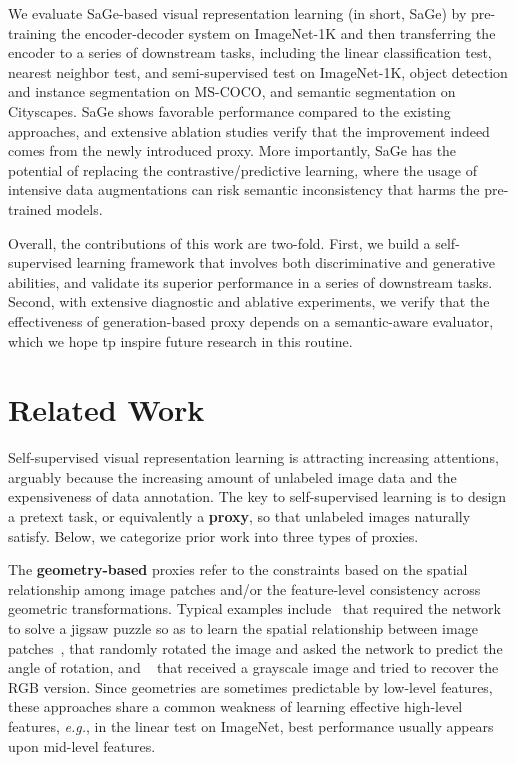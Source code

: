 \documentclass[10pt,twocolumn,letterpaper]{article}
\begin{document}
We evaluate SaGe-based visual representation learning (in short, SaGe) by pre-training the encoder-decoder system on ImageNet-1K and then transferring the encoder to a series of downstream tasks, including the linear classification test, nearest neighbor test, and semi-supervised test on ImageNet-1K, object detection and instance segmentation on MS-COCO, and semantic segmentation on Cityscapes. SaGe shows favorable performance compared to the existing approaches, and extensive ablation studies verify that the improvement indeed comes from the newly introduced proxy. More importantly, SaGe has the potential of replacing the contrastive/predictive learning, where the usage of intensive data augmentations can risk semantic inconsistency that harms the pre-trained models.

Overall, the contributions of this work are two-fold. First, we build a self-supervised learning framework that involves both discriminative and generative abilities, and validate its superior performance in a series of downstream tasks. Second, with extensive diagnostic and ablative experiments, we verify that the effectiveness of generation-based proxy depends on a semantic-aware evaluator, which we hope tp inspire future research in this routine.


\section{Related Work}
\label{sec:related}

Self-supervised visual representation learning is attracting increasing attentions, arguably because the increasing amount of unlabeled image data and the expensiveness of data annotation. The key to self-supervised learning is to design a pretext task, or equivalently a \textbf{proxy}, so that unlabeled images naturally satisfy. Below, we categorize prior work into three types of proxies.

The \textbf{geometry-based} proxies refer to the constraints based on the spatial relationship among image patches and/or the feature-level consistency across geometric transformations. Typical examples include~\cite{jigsaw} that required the network to solve a jigsaw puzzle so as to learn the spatial relationship between image patches~\cite{context,wei2019iterative}, \cite{rotation} that randomly rotated the image and asked the network to predict the angle of rotation, and ~\cite{colorization} that received a grayscale image and tried to recover the RGB version. Since geometries are sometimes predictable by low-level features, these approaches share a common weakness of learning effective high-level features, \textit{e.g.}, in the linear test on ImageNet, best performance usually appears upon mid-level features.
\end{document}
